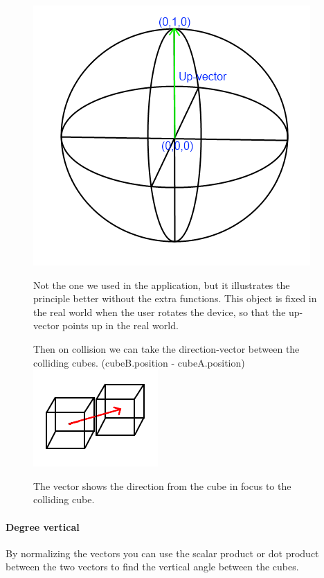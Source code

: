 \begin{figure}[ht] 
        \capstart
        \centering  
        \includegraphics{images/GyroObjectModel.png}    
        \caption[Model of the game-object used to get the direction up]{Not the one we used in the application, but it illustrates the principle better without the extra functions. This object is fixed in the real world when the user rotates the device, so that the up-vector points up in the real world.} 
        \label{fig:Gyro_model} 
 Then on collision we can take the direction-vector between the colliding cubes. (cubeB.position - cubeA.position)
        \capstart
        \centering  
        \includegraphics{images/CollisionDirectionObject.png}    
        \caption[Model of the collision direction vector]{The vector shows the direction from the cube in focus to the colliding cube.} 
        \label{fig:Collision_Direction_model} 
\end{figure}
\paragraph{Degree vertical}
By normalizing the vectors you can use the scalar product or dot product between the two vectors to find the vertical angle between the cubes.

